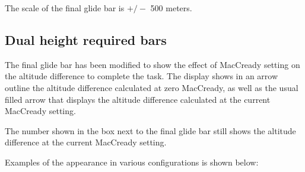 The scale of the final glide bar is $+/-$ 500 meters.

\subsection*{Dual height required bars}

The final glide bar has been modified to show the effect of MacCready
setting on the altitude difference to complete the task.  The display
shows in an arrow outline the altitude difference calculated at zero
MacCready, as well as the usual filled arrow that displays the
altitude difference calculated at the current MacCready setting.

The number shown in the box next to the final glide bar still shows
the altitude difference at the current MacCready setting.

Examples of the appearance in various configurations is shown below:

